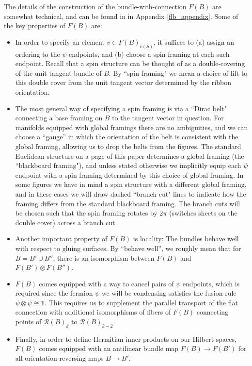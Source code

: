 \documentclass[12pt,a4paper]{article}
\newcommand{\tp}{\otimes}
\newcommand{\unit}{\mathds{1}}
\newcommand{\mcr}{\mathcal{R}}
\begin{document}
\medskip

The details of the construction of the bundle-with-connection $F(B)$ are somewhat technical, 
and can be found in in Appendix \ref{flb_appendix}.
Some of the key properties of $F(B)$ are:
\begin{itemize}
\item In order to specify an element $v\in F(B)_{e(S)}$, it suffices to (a) assign an ordering to the $\psi$-endpoints,
and (b) choose a spin-framing at each such endpoint.
Recall that a spin structure can be thought of as a double-covering of the unit tangent bundle of $B$.
By ``spin framing" we mean a choice of lift to this double cover from the unit tangent vector determined by the ribbon orientation.
\item The most general way of specifying a spin framing is via a ``Dirac belt" connecting a base framing 
on $B$ to the tangent vector in question.
For manifolds equipped with global framings there are no ambiguities, and we can choose
a ``gauge'' in which the orientation of the belt is consistent
with the global framing, allowing us to drop the belts from the figures.
The standard Euclidean structure on a page of this paper determines a global framing (the ``blackboard framing"),
and unless stated otherwise we implicitly equip each 
$\psi$ endpoint with a spin framing determined by this choice of global framing.
In some figures we have in mind a spin structure with a different global framing,
and in these cases we will draw dashed ``branch cut" lines to indicate how the framing
differs from the standard blackboard framing. 
The branch cuts will be chosen such that 
the spin framing rotates by $2\pi$ (switches sheets on the double cover) across a branch cut. 
\item Another important property of $F(B)$ is locality: The bundles behave well with respect to gluing surfaces.
By ``behave well'', we roughly mean that for $B = B' \cup B''$, 
there is an isomorphism between $F(B)$ and $F(B')\tp F(B'')$.
\item $F(B)$ comes equipped with a way to cancel pairs of $\psi$ endpoints, which is required since the fermion 
$\psi$ we will be condensing satisfies the fusion rule $\psi \tp \psi \cong \unit$.
This requires us to supplement the parallel transport of the flat connection with additional isomorphisms of
fibers of $F(B)$ connecting points of $\mcr(B)_k$ to $\mcr(B)_{k-2}$.
\item Finally, in order to define Hermitian inner products on our Hilbert spaces, $F(B)$ comes equipped with 
an antilinear bundle map $F(B) \to F(B')$ for all orientation-reversing maps $B \to B'$.
\end{itemize}
\end{document}
